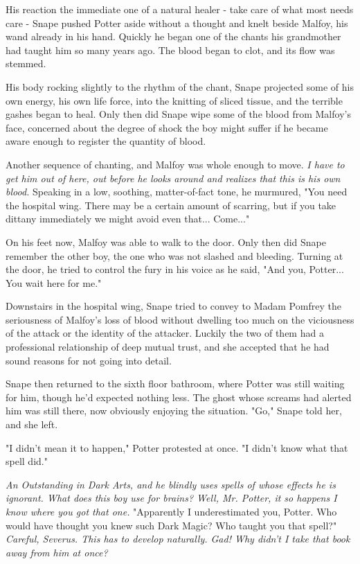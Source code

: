 His reaction the immediate one of a natural healer - take care of what most needs care - Snape pushed Potter aside without a thought and knelt beside Malfoy, his wand already in his hand. Quickly he began one of the chants his grandmother had taught him so many years ago. The blood began to clot, and its flow was stemmed.

His body rocking slightly to the rhythm of the chant, Snape projected some of his own energy, his own life force, into the knitting of sliced tissue, and the terrible gashes began to heal. Only then did Snape wipe some of the blood from Malfoy's face, concerned about the degree of shock the boy might suffer if he became aware enough to register the quantity of blood.

Another sequence of chanting, and Malfoy was whole enough to move. \emph{I have to get him out of here, out before he looks around and realizes that this is his own blood.} Speaking in a low, soothing, matter-of-fact tone, he murmured, "You need the hospital wing. There may be a certain amount of scarring, but if you take dittany immediately we might avoid even that... Come..."

On his feet now, Malfoy was able to walk to the door. Only then did Snape remember the other boy, the one who was not slashed and bleeding. Turning at the door, he tried to control the fury in his voice as he said, "And you, Potter... You wait here for me."

Downstairs in the hospital wing, Snape tried to convey to Madam Pomfrey the seriousness of Malfoy's loss of blood without dwelling too much on the viciousness of the attack or the identity of the attacker. Luckily the two of them had a professional relationship of deep mutual trust, and she accepted that he had sound reasons for not going into detail.

Snape then returned to the sixth floor bathroom, where Potter was still waiting for him, though he'd expected nothing less. The ghost whose screams had alerted him was still there, now obviously enjoying the situation. "Go," Snape told her, and she left.

"I didn't mean it to happen," Potter protested at once. "I didn't know what that spell did."

\emph{An Outstanding in Dark Arts, and he blindly uses spells of whose effects he is ignorant. What does this boy use for brains? Well, Mr. Potter, it so happens I know where you got that one.} "Apparently I underestimated you, Potter. Who would have thought you knew such Dark Magic? Who taught you that spell?" \emph{Careful, Severus. This has to develop naturally. Gad! Why didn't I take that book away from him at once?}


